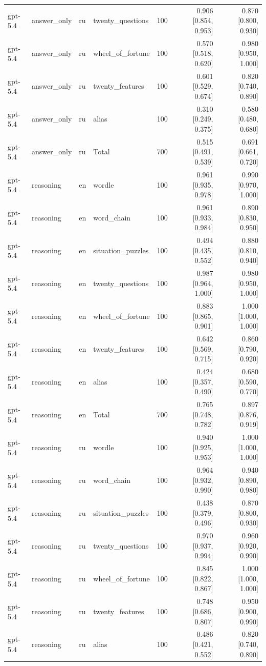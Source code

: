 \begin{longtable}{llllrrr}
gpt-5.4 & answer\_only & ru & twenty\_questions & 100 & 0.906 [0.854, 0.953] & 0.870 [0.800, 0.930] \\
gpt-5.4 & answer\_only & ru & wheel\_of\_fortune & 100 & 0.570 [0.518, 0.620] & 0.980 [0.950, 1.000] \\
gpt-5.4 & answer\_only & ru & twenty\_features & 100 & 0.601 [0.529, 0.674] & 0.820 [0.740, 0.890] \\
gpt-5.4 & answer\_only & ru & alias & 100 & 0.310 [0.249, 0.375] & 0.580 [0.480, 0.680] \\
gpt-5.4 & answer\_only & ru & Total & 700 & 0.515 [0.491, 0.539] & 0.691 [0.661, 0.720] \\
gpt-5.4 & reasoning & en & wordle & 100 & 0.961 [0.935, 0.978] & 0.990 [0.970, 1.000] \\
gpt-5.4 & reasoning & en & word\_chain & 100 & 0.961 [0.933, 0.984] & 0.890 [0.830, 0.950] \\
gpt-5.4 & reasoning & en & situation\_puzzles & 100 & 0.494 [0.435, 0.552] & 0.880 [0.810, 0.940] \\
gpt-5.4 & reasoning & en & twenty\_questions & 100 & 0.987 [0.964, 1.000] & 0.980 [0.950, 1.000] \\
gpt-5.4 & reasoning & en & wheel\_of\_fortune & 100 & 0.883 [0.865, 0.901] & 1.000 [1.000, 1.000] \\
gpt-5.4 & reasoning & en & twenty\_features & 100 & 0.642 [0.569, 0.715] & 0.860 [0.790, 0.920] \\
gpt-5.4 & reasoning & en & alias & 100 & 0.424 [0.357, 0.490] & 0.680 [0.590, 0.770] \\
gpt-5.4 & reasoning & en & Total & 700 & 0.765 [0.748, 0.782] & 0.897 [0.876, 0.919] \\
gpt-5.4 & reasoning & ru & wordle & 100 & 0.940 [0.925, 0.953] & 1.000 [1.000, 1.000] \\
gpt-5.4 & reasoning & ru & word\_chain & 100 & 0.964 [0.932, 0.990] & 0.940 [0.890, 0.980] \\
gpt-5.4 & reasoning & ru & situation\_puzzles & 100 & 0.438 [0.379, 0.496] & 0.870 [0.800, 0.930] \\
gpt-5.4 & reasoning & ru & twenty\_questions & 100 & 0.970 [0.937, 0.994] & 0.960 [0.920, 0.990] \\
gpt-5.4 & reasoning & ru & wheel\_of\_fortune & 100 & 0.845 [0.822, 0.867] & 1.000 [1.000, 1.000] \\
gpt-5.4 & reasoning & ru & twenty\_features & 100 & 0.748 [0.686, 0.807] & 0.950 [0.900, 0.990] \\
gpt-5.4 & reasoning & ru & alias & 100 & 0.486 [0.421, 0.552] & 0.820 [0.740, 0.890] \\

\end{longtable}
